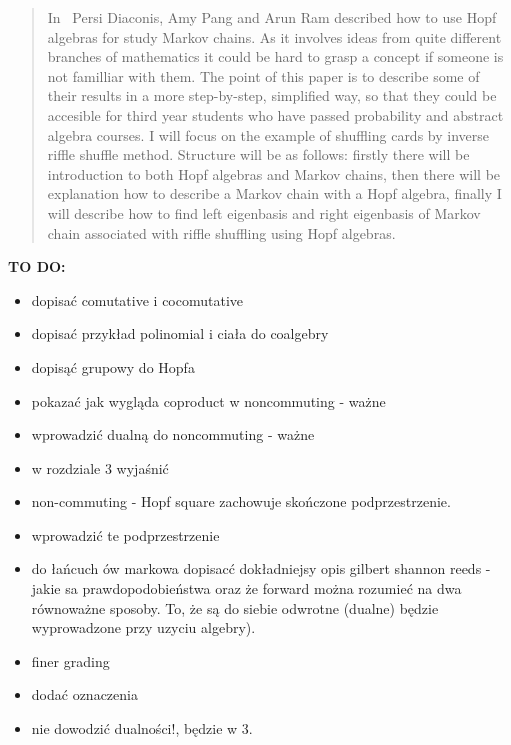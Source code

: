 \documentclass[a4paper, 12pt]{report}
\newcommand{\todo}[1]{\hfill \break \textbf{\Huge TO DO: #1 \hfill \break}\normalsize}
\begin{document}
\begin{abstract}

In~\cite{Diaconis2014} Persi Diaconis, Amy Pang and Arun Ram described how to use Hopf algebras for
study Markov chains. As it involves ideas from quite different branches of mathematics it could be hard to
grasp a concept if someone is not familliar with them.
The point of this paper is to describe some of their results in a more step-by-step, simplified way,
so that they could be accesible for third year students who have passed probability
and abstract algebra courses. I will focus on the example of shuffling cards by inverse riffle shuffle 
method. Structure will be as follows: firstly there will be introduction to both Hopf algebras and Markov 
chains, then there will be explanation how to describe a Markov chain with a Hopf algebra, finally I will 
describe how to find left eigenbasis and right eigenbasis of Markov chain associated with riffle shuffling
using Hopf algebras.


\end{abstract}
\todo{}
\begin{itemize}
\item dopisać comutative i cocomutative
\item dopisać przykład polinomial i ciała do coalgebry
\item dopisąć grupowy do Hopfa
\item pokazać jak wygląda coproduct w noncommuting - ważne
\item wprowadzić dualną do noncommuting - ważne
\item w rozdziale 3 wyjaśnić 
\item non-commuting - Hopf square zachowuje skończone podprzestrzenie.
\item wprowadzić te podprzestrzenie
\item do łańcuch ów markowa dopisacć dokładniejsy opis gilbert shannon reeds - jakie sa prawdopodobieństwa 
oraz że forward można rozumieć na dwa równoważne sposoby. To, że są do siebie odwrotne (dualne) będzie 
wyprowadzone przy uzyciu algebry).
\item finer grading
\item dodać oznaczenia
\item nie dowodzić dualności!, będzie w 3.
\end{itemize}
\end{document}
